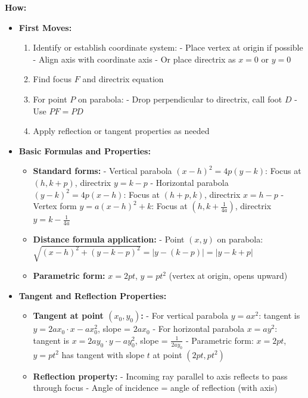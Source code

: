 \documentclass[12pt]{article}
\begin{document}
\textbf{How:}
\begin{itemize}
    \item \textbf{First Moves:} 
    \begin{enumerate}
        \item Identify or establish coordinate system:
            - Place vertex at origin if possible
            - Align axis with coordinate axis
            - Or place directrix as $x = 0$ or $y = 0$
        \item Find focus $F$ and directrix equation
        \item For point $P$ on parabola:
            - Drop perpendicular to directrix, call foot $D$
            - Use $PF = PD$
        \item Apply reflection or tangent properties as needed
    \end{enumerate}
    
    \item \textbf{Basic Formulas and Properties:}
    \begin{itemize}
        \item \textbf{Standard forms:}
            - Vertical parabola $(x-h)^2 = 4p(y-k)$: Focus at $(h, k+p)$, directrix $y = k-p$
            - Horizontal parabola $(y-k)^2 = 4p(x-h)$: Focus at $(h+p, k)$, directrix $x = h-p$
            - Vertex form $y = a(x-h)^2 + k$: Focus at $(h, k+\frac{1}{4a})$, directrix $y = k-\frac{1}{4a}$
        \item \textbf{Distance formula application:}
            - Point $(x,y)$ on parabola: $\sqrt{(x-h)^2 + (y-k-p)^2} = |y-(k-p)| = |y-k+p|$
        \item \textbf{Parametric form:} $x = 2pt$, $y = pt^2$ (vertex at origin, opens upward)
    \end{itemize}
    
    \item \textbf{Tangent and Reflection Properties:}
    \begin{itemize}
        \item \textbf{Tangent at point $(x_0, y_0)$:}
            - For vertical parabola $y = ax^2$: tangent is $y = 2ax_0 \cdot x - ax_0^2$, slope = $2ax_0$
            - For horizontal parabola $x = ay^2$: tangent is $x = 2ay_0 \cdot y - ay_0^2$, slope = $\frac{1}{2ay_0}$
            - Parametric form: $x = 2pt$, $y = pt^2$ has tangent with slope $t$ at point $(2pt, pt^2)$
        \item \textbf{Reflection property:}
            - Incoming ray parallel to axis reflects to pass through focus
            - Angle of incidence = angle of reflection (with axis)
    \end{itemize}
    

\end{itemize}
\end{document}

